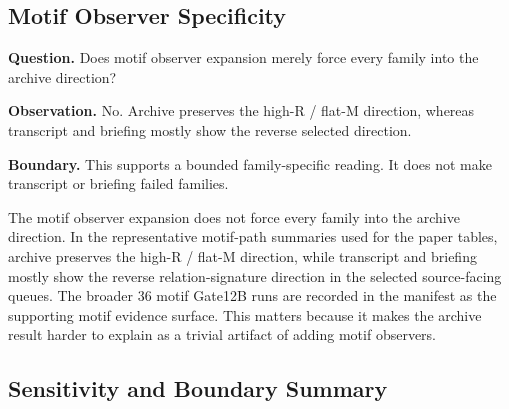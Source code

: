 \documentclass[11pt]{article}
\begin{document}
\subsection{Motif Observer Specificity}

\textbf{Question.} Does motif observer expansion merely force every family into
the archive direction?

\textbf{Observation.} No. Archive preserves the high-R / flat-M direction,
whereas transcript and briefing mostly show the reverse selected direction.

\textbf{Boundary.} This supports a bounded family-specific reading. It does not
make transcript or briefing failed families.

The motif observer expansion does not force every family into the archive
direction. In the representative motif-path summaries used for the paper
tables, archive preserves the high-R / flat-M direction, while transcript and
briefing mostly show the reverse relation-signature direction in the selected
source-facing queues. The broader 36 motif Gate12B runs are recorded in the
manifest as the supporting motif evidence surface. This matters because it
makes the archive result harder to explain as a trivial artifact of adding
motif observers.

\subsection{Sensitivity and Boundary Summary}
\end{document}
